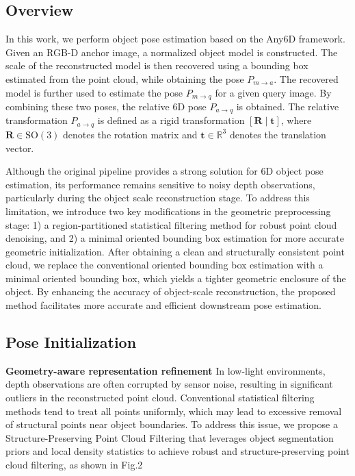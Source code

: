 \documentclass[letterpaper, 10 pt, journal, twoside]{IEEEtran}  %
\begin{document}
  \subsection{Overview}
  In this work, we perform object pose estimation based on the Any6D framework. 
  Given an RGB-D anchor image, a normalized object model is constructed. 
  The scale of the reconstructed model is then recovered using a bounding box estimated from the point cloud, while obtaining the pose $P_{m \rightarrow a}$. 
  The recovered model is further used to estimate the pose $P_{m \rightarrow q}$ for a given query image. 
  By combining these two poses, the relative 6D pose $P_{a \rightarrow q}$ is obtained.
  The relative transformation $P_{a \rightarrow q}$ is defined as a rigid transformation $[\mathbf{R} \mid \mathbf{t}]$, where $\mathbf{R} \in \mathrm{SO}(3)$ denotes the rotation matrix and $\mathbf{t} \in \mathbb{R}^3$ denotes the translation vector.
  
  Although the original pipeline provides a strong solution for 6D object pose estimation, its performance remains sensitive to noisy depth observations, particularly during the object scale reconstruction stage.
  To address this limitation, we introduce two key modifications in the geometric preprocessing stage: 1) a region-partitioned statistical filtering method for robust point cloud denoising, and 2) a minimal oriented bounding box estimation for more accurate geometric initialization.
  After obtaining a clean and structurally consistent point cloud, we replace the conventional  oriented bounding box estimation with a minimal oriented bounding box, which yields a tighter geometric enclosure of the object. By enhancing the accuracy of object-scale reconstruction, the proposed method facilitates more accurate and efficient downstream pose estimation.
  \subsection{Pose Initialization}
  \textbf{Geometry-aware representation refinement}    
  In low-light environments, depth observations are often corrupted by sensor noise, resulting in significant outliers in the reconstructed point cloud. Conventional statistical filtering methods tend to treat all points uniformly, which may lead to excessive removal of structural points near object boundaries. To address this issue, we propose a Structure-Preserving Point Cloud Filtering that leverages object segmentation priors and local density statistics to achieve robust and structure-preserving point cloud filtering, as shown in Fig.2
  
\end{document}
